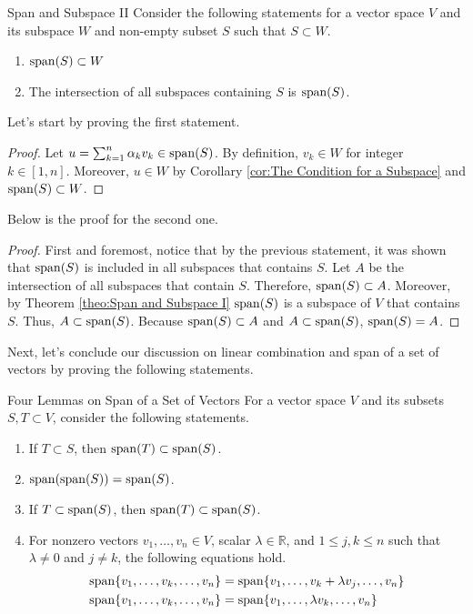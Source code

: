 \documentclass[../main.tex]{subfiles}
\begin{document}
\begin{theorem}{}{Span and Subspace II}
Consider the following statements for a vector space $V$ and its
subspace $W$ and non-empty subset $S$ such that $S \subset W$.
\begin{enumerate}[noitemsep]
\item $\operatorname{span}(S) \subset W$
\item The intersection of all subspaces containing $S$ is $\operatorname{span}(S)$.
\end{enumerate}
\end{theorem}

Let's start by proving the first statement.

\begin{proof}
Let $u = \sum_{k = 1}^n \alpha_k v_k \in \operatorname{span}(S)$. By definition,
$v_k \in W$ for integer $k \in [1, n]$. Moreover, $u \in W$ by
Corollary \ref{cor:The Condition for a Subspace} and $\operatorname{span}(S)
\subset W$.
\end{proof}

Below is the proof for the second one.

\begin{proof}
First and foremost, notice that by the previous statement, it was
shown that $\operatorname{span}(S)$ is included in all subspaces that contains $S$.
Let $A$ be the intersection of all subspaces that contain $S$.
Therefore, $\operatorname{span}(S) \subset A$. Moreover, by Theorem
\ref{theo:Span and Subspace I} $\operatorname{span}(S)$ is a subspace of $V$ that
contains $S$. Thus, $A \subset \operatorname{span}(S)$. Because $\operatorname{span}(S) \subset A$
and $A \subset \operatorname{span}(S)$, $\operatorname{span}(S) = A$.
\end{proof}

Next, let's conclude our discussion on linear combination and span
of a set of vectors by proving the following statements.

\begin{theorem}{}{Four Lemmas on Span of a Set of Vectors}
For a vector space $V$ and its subsets $S, T \subset V$, consider the
following statements.
\begin{enumerate}[noitemsep]
\item If $T \subset S$, then $\operatorname{span}(T) \subset \operatorname{span}(S)$.
\item $\operatorname{span}(\operatorname{span}(S)) = \operatorname{span}(S)$.
\item If $T \subset \operatorname{span}(S)$, then $\operatorname{span}(T) \subset \operatorname{span}(S)$.
\item For nonzero vectors $v_1, \ldots, v_n \in V$, scalar
$\lambda \in \mathbb{R}$, and $1 \leq j, k \leq n$ such that $\lambda
\neq 0$ and $j \neq k$, the following equations hold.
\vspace{-0.5\baselineskip}
\begin{align*}
    \operatorname{span}\{ v_1, \ldots, v_k, \ldots, v_n \}
    &= \operatorname{span}\{ v_1, \ldots, v_k + \lambda v_j, \ldots, v_n \} \\
    \operatorname{span}\{ v_1, \ldots, v_k, \ldots, v_n \}
    &= \operatorname{span}\{ v_1, \ldots, \lambda v_k, \ldots, v_n \}
\end{align*}
\end{enumerate}
\end{theorem}
\end{document}
